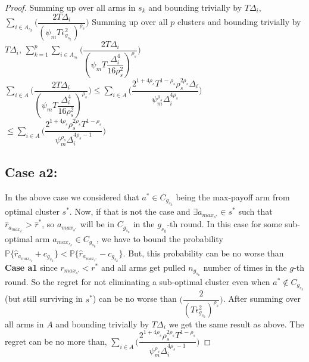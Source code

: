 \begin{proof}
\newline
Summing up over all arms in $s_{k}$ and bounding trivially by $T\Delta_{i}$,
$\sum_{i\in A_{s_{k}}}\bigg(\dfrac{2T\Delta_{i}}{(\psi_{m}T\epsilon_{g_{s_{k}}}^{2})^{\rho_{s}}}\bigg)$
\newline
Summing up over all $p$ clusters and bounding trivially by $T\Delta_{i}$,
\newline\hspace*{4em} $\sum_{k=1}^{p}\sum_{i\in A_{s_{k}}}\bigg(\dfrac{2T\Delta_{i}}{(\psi_{m}T\dfrac{\Delta_{i}^{4}}{16\rho_{s}^{2}})^{\rho_{s}}}\bigg)$
\newline\hspace*{4em} $\sum_{i\in A}\bigg(\dfrac{2T\Delta_{i}}{(\psi_{m}T\dfrac{\Delta_{i}^{4}}{16\rho_{s}^{2}})^{\rho_{s}}}\bigg)\leq \sum_{i\in A}\bigg(\dfrac{2^{1+4\rho_{s}}T^{1-\rho_{s}}\rho_{s}^{2\rho_{s}}\Delta_{i}}{\psi_{m}^{\rho_{s}}\Delta_{i}^{4\rho_{s}}}\bigg)$
\newline\hspace*{14em}
$\leq \sum_{i\in A}\bigg(\dfrac{2^{1+4\rho_{s}}\rho_{s}^{2\rho_{s}}T^{1-\rho_{s}}}{\psi_{m}^{\rho_{s}}\Delta_{i}^{4\rho_{s}-1}}\bigg)$

\subsection{Case a2:}
In the above case we considered that $a^{*}\in C_{g_{s_{k}}}$ being the max-payoff arm from optimal cluster $s^{*}$. Now, if that is not the case and $\exists a_{max_{s^{*}}}\in s^{*}$ such that $\hat{r}_{a_{max_{s^{*}}}}> \hat{r}^{*}$, so $a_{max_{s^{*}}}$ will be in $C_{g_{s_{k}}}$ in the $g_{s_{k}}$-th round. In this case for some sub-optimal arm $a_{max_{s_{k}}}\in C_{g_{s_{k}}}$, we have to bound the probability $\mathbb{P}\bigg\lbrace\hat{r}_{a_{max_{s_{k}}}}+c_{g_{s_{k}}}\bigg\rbrace< \mathbb{P}\bigg\lbrace\hat{r}_{a_{max_{s^{*}}}}-c_{g_{s_{k}}}\bigg\rbrace$. But, this probability can be no worse than \textbf{Case a1} since $r_{max_{s^{*}}} < r^{*}$ and all arms get pulled $n_{g_{s_{k}}}$ number of times in the $g$-th round. So the regret for not eliminating a sub-optimal cluster even when $a^{*}\notin C_{g_{s_{k}}}$(but still surviving in $s^{*}$) can be no worse than $\bigg(\dfrac{2}{(T\epsilon_{g_{s_{k}}}^{2})^{\rho_{s}}}\bigg)$. After summing over all arms in $A$ and bounding trivially by $T\Delta_{i}$ we get the same result as above. The regret can be no more than,
\newline
$\sum_{i\in A}\bigg(\dfrac{2^{1+4\rho_{s}}\rho_{s}^{2\rho_{s}}T^{1-\rho_{s}}}{\psi_{m}^{\rho_{s}}\Delta_{i}^{4\rho_{s}-1}}\bigg)$



\end{proof}
